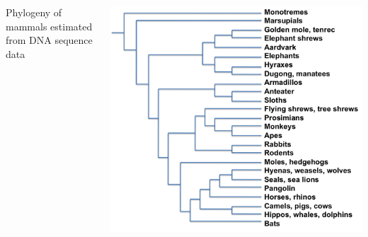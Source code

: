 \begin{noheadline}
\begin{frame}
    \begin{adjustwidth}{-1.5em}{-1.5em}
        \begin{columns}

            Phylogeny of mammals estimated from DNA sequence data


            \includegraphics[width=1.02\columnwidth]{mammal-tree.png}

        \end{columns}

    \end{adjustwidth}
\end{frame}
\end{noheadline}

